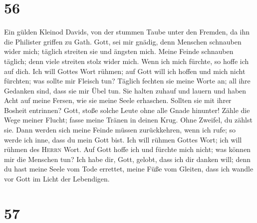 \hypertarget{section-55}{%
\section{56}\label{section-55}}

 Ein gülden Kleinod Davids, von der stummen Taube unter
den Fremden, da ihn die Philister griffen zu Gath.  Gott,
sei mir gnädig, denn Menschen schnauben wider mich; täglich streiten sie
und ängsten mich.  Meine Feinde schnauben täglich; denn
viele streiten stolz wider mich.  Wenn ich mich fürchte,
so hoffe ich auf dich.  Ich will Gottes Wort rühmen; auf
Gott will ich hoffen und mich nicht fürchten; was sollte mir Fleisch
tun?  Täglich fechten sie meine Worte an; all ihre
Gedanken sind, dass sie mir Übel tun.  Sie halten zuhauf
und lauern und haben Acht auf meine Fersen, wie sie meine Seele
erhaschen.  Sollten sie mit ihrer Bosheit entrinnen? Gott,
stoße solche Leute ohne alle Gnade hinunter!  Zähle die
Wege meiner Flucht; fasse meine Tränen in deinen Krug. Ohne Zweifel, du
zählst sie.  Dann werden sich meine Feinde müssen
zurückkehren, wenn ich rufe; so werde ich inne, dass du mein Gott bist.
 Ich will rühmen Gottes Wort; ich will rühmen des
\textsc{Herrn} Wort.  Auf Gott hoffe ich und fürchte mich
nicht; was können mir die Menschen tun?  Ich habe dir,
Gott, gelobt, dass ich dir danken will;  denn du hast
meine Seele vom Tode errettet, meine Füße vom Gleiten, dass ich wandle
vor Gott im Licht der Lebendigen.

\hypertarget{section-56}{%
\section{57}\label{section-56}}

